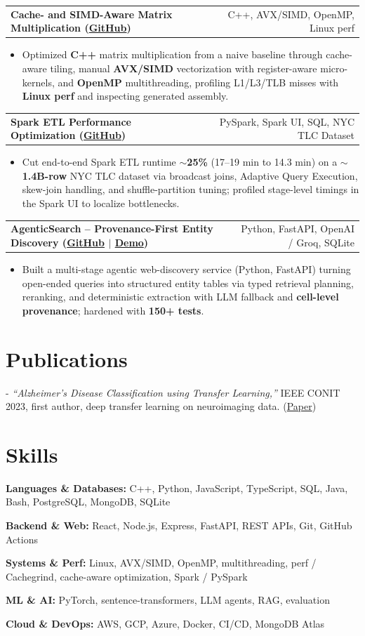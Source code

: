 \documentclass[letterpaper,11pt]{article}
\makeatletter
\newcommand{\projItem}[2]{%
  \vspace{2pt}
  \begin{tabular*}{\textwidth}{@{}l@{\extracolsep{\fill}}r@{}}
    \textbf{#1} & #2 \\
  \end{tabular*}\par\vspace{-3pt}
}
\newcommand{\skillLine}[2]{\textbf{#1:} #2\par\vspace{1.5pt}}
\newcommand{\inlineBlock}[1]{{\setlength{\leftskip}{0.18in}\small #1\par}}
\makeatother
\begin{document}
\projItem{Cache- and SIMD-Aware Matrix Multiplication {\normalfont\small(\href{https://github.com/Deva-1903/cs690pf}{GitHub})}}{C++, AVX/SIMD, OpenMP, Linux perf}
\begin{itemize}
  \item Optimized \textbf{C++} matrix multiplication from a naive baseline through cache-aware tiling, manual \textbf{AVX/SIMD} vectorization with register-aware micro-kernels, and \textbf{OpenMP} multithreading, profiling L1/L3/TLB misses with \textbf{Linux perf} and inspecting generated assembly.
\end{itemize}

\projItem{Spark ETL Performance Optimization {\normalfont\small(\href{https://github.com/Deva-1903/Spark-ETL-Optimization}{GitHub})}}{PySpark, Spark UI, SQL, NYC TLC Dataset}
\begin{itemize}
  \item Cut end-to-end Spark ETL runtime \textbf{$\sim$25\%} (17--19 min to 14.3 min) on a \textbf{$\sim$1.4B-row} NYC TLC dataset via broadcast joins, Adaptive Query Execution, skew-join handling, and shuffle-partition tuning; profiled stage-level timings in the Spark UI to localize bottlenecks.
\end{itemize}

\projItem{AgenticSearch -- Provenance-First Entity Discovery {\normalfont\small(\href{https://github.com/Deva-1903/ciir_agentic_search}{GitHub} $\vert$ \href{https://agentic-search-negglszkwa-uc.a.run.app}{Demo})}}{Python, FastAPI, OpenAI / Groq, SQLite}
\begin{itemize}
  \item Built a multi-stage agentic web-discovery service (Python, FastAPI) turning open-ended queries into structured entity tables via typed retrieval planning, reranking, and deterministic extraction with LLM fallback and \textbf{cell-level provenance}; hardened with \textbf{150+ tests}.
\end{itemize}

\section{Publications}
\vspace{2pt}
\inlineBlock{- \textit{``Alzheimer's Disease Classification using Transfer Learning,''} IEEE CONIT 2023, first author, deep transfer learning on neuroimaging data. {\normalfont\small(\href{https://ieeexplore.ieee.org/document/10205760}{Paper})}}

\section{Skills}
\skillLine{Languages \& Databases}{C++, Python, JavaScript, TypeScript, SQL, Java, Bash, PostgreSQL, MongoDB, SQLite}
\skillLine{Backend \& Web}{React, Node.js, Express, FastAPI, REST APIs, Git, GitHub Actions}
\skillLine{Systems \& Perf}{Linux, AVX/SIMD, OpenMP, multithreading, perf / Cachegrind, cache-aware optimization, Spark / PySpark}
\skillLine{ML \& AI}{PyTorch, sentence-transformers, LLM agents, RAG, evaluation}
\skillLine{Cloud \& DevOps}{AWS, GCP, Azure, Docker, CI/CD, MongoDB Atlas}
\end{document}
